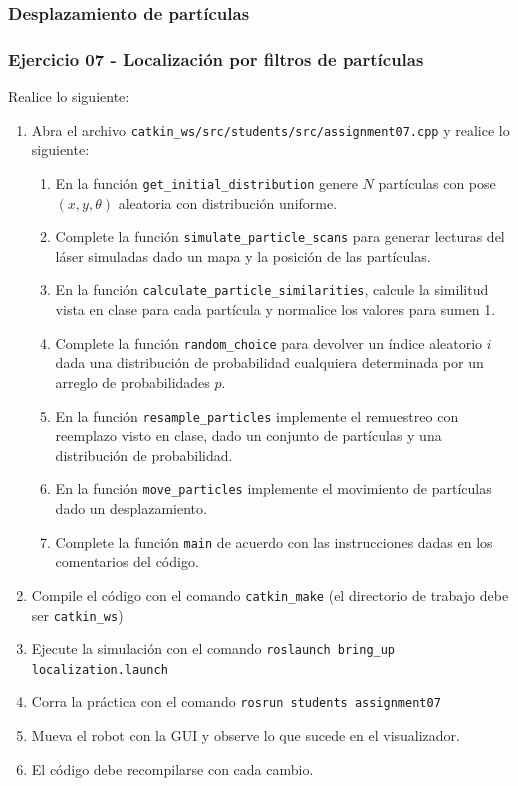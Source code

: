 \begin{frame}\frametitle{Desplazamiento de partículas}
\end{frame}

\begin{frame}[containsverbatim]\frametitle{Ejercicio 07 - Localización por filtros de partículas}
Realice lo siguiente:
  \begin{enumerate}
  \item Abra el archivo \texttt{catkin\_ws/src/students/src/assignment07.cpp} y realice lo siguiente:
    \begin{enumerate}
    \item En la función \texttt{get\_initial\_distribution} genere $N$ partículas con pose $(x,y,\theta)$ aleatoria con distribución uniforme. 
    \item Complete la función \texttt{simulate\_particle\_scans} para generar lecturas del láser simuladas dado un mapa y la posición de las partículas. 
    \item En la función \texttt{calculate\_particle\_similarities}, calcule la similitud vista en clase para cada partícula y normalice los valores para sumen 1.
    \item Complete la función \texttt{random\_choice} para devolver un índice aleatorio $i$ dada una distribución de probabilidad cualquiera determinada por un arreglo de probabilidades $p$.
    \item En la función \texttt{resample\_particles} implemente el remuestreo con reemplazo visto en clase, dado un conjunto de partículas y una distribución de probabilidad.
    \item En la función \texttt{move\_particles} implemente el movimiento de partículas dado un desplazamiento.
    \item Complete la función \texttt{main} de acuerdo con las instrucciones dadas en los comentarios del código. 
    \end{enumerate}
  \item Compile el código con el comando \texttt{catkin\_make} (el directorio de trabajo debe ser \texttt{catkin\_ws})
  \item Ejecute la simulación con el comando \texttt{roslaunch bring\_up localization.launch}
  \item Corra la práctica con el comando \texttt{rosrun students assignment07}
  \item Mueva el robot con la GUI y observe lo que sucede en el visualizador. 
  \item El código debe recompilarse con cada cambio. 
  \end{enumerate}
\end{frame}

